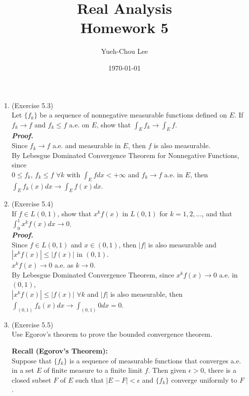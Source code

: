 \documentclass[a4paper,11pt]{article}
\title{Real Analysis \\ Homework 5}
\author{Yueh-Chou Lee}
\date{\today}
\begin{document}
\maketitle
\begin{enumerate}


\item (Exercise 5.3)\\
 Let $\{ f_k \}$ be a sequence of nonnegative measurable functions defined on $E$. If $f_k \to f$ and $f_k \leq f$ a.e. on $E$, show that $\int_{E} f_k \to \int_{E} f$.\\
 \newline
 \textit{\textbf {Proof.}}\\
 Since $f_k \to f$ a.e. and measurable in $E$, then $f$ is also measurable.\\
 By Lebesgue Dominated Convergence Theorem for Nonnegative Functions, since\\$0 \leq f_k$, $f_k \leq f$ $\forall k$ with $\int_E f dx < +\infty$ and $f_k \to f$ a.e. in $E$, then $\int_E f_k(x) dx \to \int_E f(x) dx$.\\








\item (Exercise 5.4)\\
 If $f \in L(0,1)$, show that $x^k f(x)$ in $L(0,1)$ for $k = 1,2,...$, and that $\int_{0}^{1} x^k f(x) dx \to 0$.\\
 \newline
 \textit{\textbf {Proof.}}\\
 Since $f \in L(0,1)$ and $x \in (0,1)$, then $|f|$ is also measurable and $|x^k f(x)| \leq |f(x)|$ in $(0,1)$.\\
 $x^k f(x) \to 0$ a.e. as $k \to 0$.\\
 By Lebesgue Dominated Convergence Theorem, since $x^k f(x) \to 0$ a.e. in $(0,1)$,\\$|x^k f(x)| \leq |f(x)|$ $\forall k$ and $|f|$ is also measurable, then $\int_{(0,1)} f_k(x) dx \to \int_{(0,1)} 0 dx = 0$.\\ 








\item (Exercise 5.5)\\
 Use Egorov's theorem to prove the bounded convergence theorem.\
 
 \textbf{Recall (Egorov's Theorem):}\\
 Suppose that $\{ f_k \}$ is a sequence of measurable functions that converges a.e. in a set $E$ of finite measure to a finite limit $f$. Then given $\epsilon > 0$, there is a closed subset $F$ of $E$ such that $|E - F| < \epsilon$ and $\{ f_k \}$ converge uniformly to $F$.\


\end{enumerate}
\end{document}
